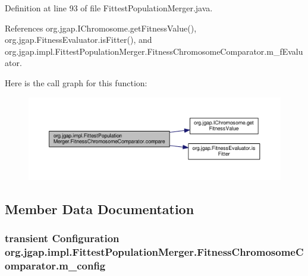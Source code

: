 Definition at line 93 of file Fittest\-Population\-Merger.\-java.



References org.\-jgap.\-I\-Chromosome.\-get\-Fitness\-Value(), org.\-jgap.\-Fitness\-Evaluator.\-is\-Fitter(), and org.\-jgap.\-impl.\-Fittest\-Population\-Merger.\-Fitness\-Chromosome\-Comparator.\-m\-\_\-f\-Evaluator.



Here is the call graph for this function\-:
\nopagebreak
\begin{figure}[H]
\begin{center}
\leavevmode
\includegraphics[width=350pt]{classorg_1_1jgap_1_1impl_1_1_fittest_population_merger_1_1_fitness_chromosome_comparator_aec3a8e6ecb333a9bea1622b296ac3862_cgraph}
\end{center}
\end{figure}




\subsection{Member Data Documentation}
\hypertarget{classorg_1_1jgap_1_1impl_1_1_fittest_population_merger_1_1_fitness_chromosome_comparator_aaaba5731a677aee1ea363ef9b6b743c2}{
\subsubsection[{m\-\_\-config}]{\setlength{\rightskip}{0pt plus 5cm}transient {\bf Configuration} org.\-jgap.\-impl.\-Fittest\-Population\-Merger.\-Fitness\-Chromosome\-Comparator.\-m\-\_\-config\hspace{0.3cm}{\ttfamily [private]}}}\label{classorg_1_1jgap_1_1impl_1_1_fittest_population_merger_1_1_fitness_chromosome_comparator_aaaba5731a677aee1ea363ef9b6b743c2}


